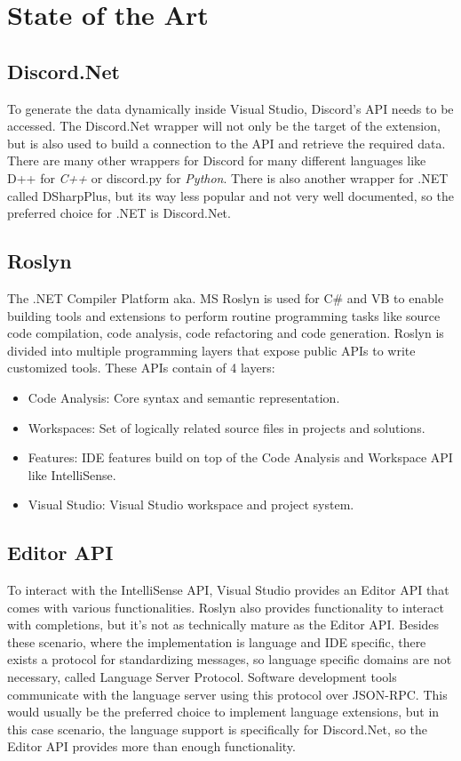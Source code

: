 \section{State of the Art}
\subsection{Discord.Net}
To generate the data dynamically inside Visual Studio, Discord's API needs to be accessed. The Discord.Net wrapper will not only be the target of the extension, but is also used to build a connection to the API and retrieve the required data. There are many other wrappers for Discord for many different languages like D++ for \textit{C++} or discord.py for \textit{Python}. There is also another wrapper for .NET called DSharpPlus, but its way less popular and not very well documented, so the preferred choice for .NET is Discord.Net.

\subsection{Roslyn}
The .NET Compiler Platform aka. MS Roslyn is used for C\# and VB to enable building tools and extensions to perform routine programming tasks like source code compilation, code analysis, code refactoring and code generation. Roslyn is divided into multiple programming layers that expose public APIs to write customized tools. These APIs contain of 4 layers:
\begin{itemize}
	\item Code Analysis: Core syntax and semantic representation.
	\item Workspaces: Set of logically related source files in projects and solutions.
	\item Features: IDE features build on top of the Code Analysis and Workspace API like IntelliSense.
	\item Visual Studio: Visual Studio workspace and project system. \cite{vasani2017roslyn}
\end{itemize}

\subsection{Editor API}
To interact with the IntelliSense API, Visual Studio provides an Editor API \cite{asynccompletionapi} that comes with various functionalities. Roslyn also provides functionality to interact with completions, but it's not as technically mature as the Editor API. Besides these scenario, where the implementation is language and IDE specific, there exists a protocol for standardizing messages, so language specific domains are not necessary, called Language Server Protocol. Software development tools communicate with the language server using this protocol over JSON-RPC. \cite{lsp} This would usually be the preferred choice to implement language extensions, but in this case scenario, the language support is specifically for Discord.Net, so the Editor API provides more than enough functionality.


